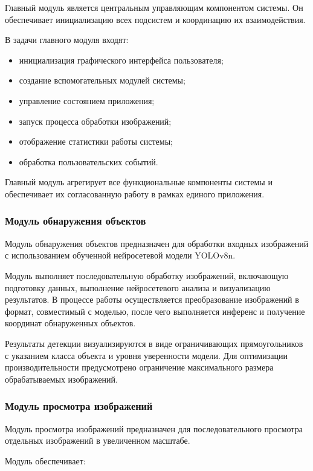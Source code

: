 Главный модуль является центральным управляющим компонентом системы. Он обеспечивает инициализацию всех подсистем и координацию их взаимодействия.

В задачи главного модуля входят:

\begin{itemize}
	\item инициализация графического интерфейса пользователя;
	\item создание вспомогательных модулей системы;
	\item управление состоянием приложения;
	\item запуск процесса обработки изображений;
	\item отображение статистики работы системы;
	\item обработка пользовательских событий.
\end{itemize}

Главный модуль агрегирует все функциональные компоненты системы и обеспечивает их согласованную работу в рамках единого приложения.

\subsubsection{Модуль обнаружения объектов}

Модуль обнаружения объектов предназначен для обработки входных изображений с использованием обученной нейросетевой модели YOLOv8n.

Модуль выполняет последовательную обработку изображений, включающую подготовку данных, выполнение нейросетевого анализа и визуализацию результатов. В процессе работы осуществляется преобразование изображений в формат, совместимый с моделью, после чего выполняется инференс и получение координат обнаруженных объектов.

Результаты детекции визуализируются в виде ограничивающих прямоугольников с указанием класса объекта и уровня уверенности модели. Для оптимизации производительности предусмотрено ограничение максимального размера обрабатываемых изображений.

\subsubsection{Модуль просмотра изображений}

Модуль просмотра изображений предназначен для последовательного просмотра отдельных изображений в увеличенном масштабе.

Модуль обеспечивает:

